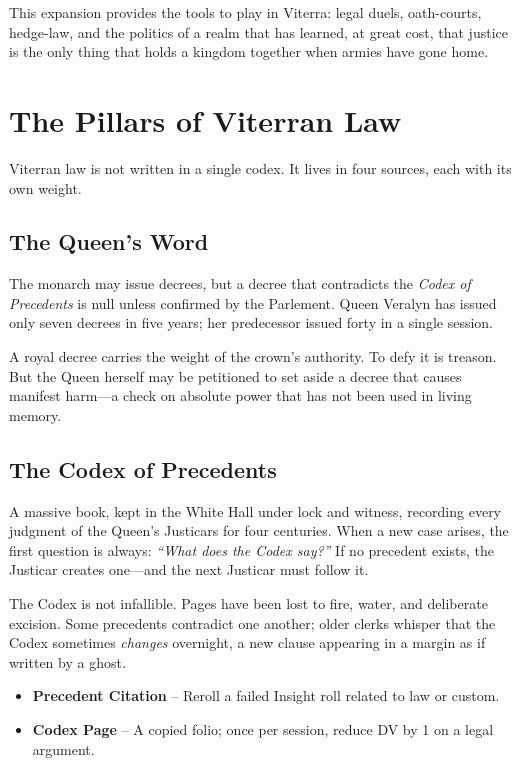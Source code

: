 \documentclass[11pt,twoside]{book}
\newenvironment{sidebar}[1][]
{\begin{tcolorbox}[colback=agedpaper,colframe=royalblue,boxrule=0.5pt,arc=2mm,title={\scshape\small #1},fonttitle=\bfseries,breakable]}
{\end{tcolorbox}}
\newcommand{\ornament}{\par\centering\adforn{36}\par}
\begin{document}
This expansion provides the tools to play in Viterra: legal duels, oath-courts, hedge-law, and the politics of a realm that has learned, at great cost, that justice is the only thing that holds a kingdom together when armies have gone home.

\ornament


\chapter{The Pillars of Viterran Law}

Viterran law is not written in a single codex. It lives in four sources, each with its own weight.

\section{The Queen's Word}

The monarch may issue decrees, but a decree that contradicts the \textit{Codex of Precedents} is null unless confirmed by the Parlement. Queen Veralyn has issued only seven decrees in five years; her predecessor issued forty in a single session.

A royal decree carries the weight of the crown's authority. To defy it is treason. But the Queen herself may be petitioned to set aside a decree that causes manifest harm---a check on absolute power that has not been used in living memory.

\section{The Codex of Precedents}

A massive book, kept in the White Hall under lock and witness, recording every judgment of the Queen's Justicars for four centuries. When a new case arises, the first question is always: \textit{``What does the Codex say?''} If no precedent exists, the Justicar creates one---and the next Justicar must follow it.

The Codex is not infallible. Pages have been lost to fire, water, and deliberate excision. Some precedents contradict one another; older clerks whisper that the Codex sometimes \textit{changes} overnight, a new clause appearing in a margin as if written by a ghost.

\begin{sidebar}[Strings (Viterran Law)]
\begin{itemize}
    \item \textbf{Precedent Citation} -- Reroll a failed Insight roll related to law or custom.
    \item \textbf{Codex Page} -- A copied folio; once per session, reduce DV by 1 on a legal argument.
\end{itemize}
\end{sidebar}
\end{document}
